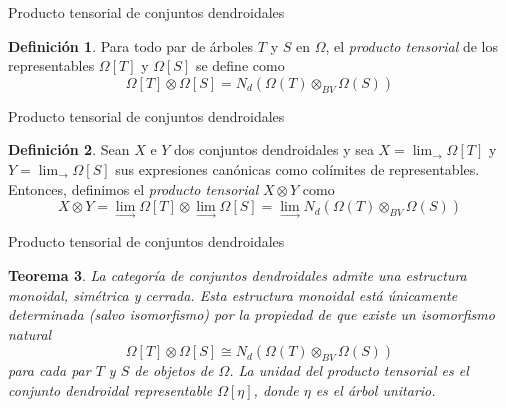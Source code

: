 \documentclass[12pt,aspectratio=169]{beamer}
\numberwithin{equation}{section}
\newtheorem{teo}{Teorema}[section]
\theoremstyle{definition}
\newtheorem{defi}[teo]{Definici\'on}
\begin{document}
{\begin{frame}{Producto tensorial de conjuntos dendroidales}
    \begin{defi}
        Para todo par de \'arboles $T$ y $S$ en $\Omega$, el \emph{producto tensorial} de los representables $\Omega[T]$ y $\Omega[S]$ se define como
        $$
            \Omega[T]\otimes\Omega[S] = N_d(\Omega(T)\otimes_{BV}\Omega(S))
        $$

    \end{defi}
\end{frame}
\begin{frame}{Producto tensorial de conjuntos dendroidales}
    \begin{defi}
        Sean $X$ e $Y$ dos conjuntos dendroidales y sea $X = \lim_{\to}\Omega[T]$ y $Y = \lim_{\to}\Omega[S]$ sus expresiones can\'onicas como col\'imites de representables. Entonces, definimos el \emph{producto tensorial} $X\otimes Y$ como
        $$
            X\otimes Y = \lim_{\to}\Omega[T]\otimes\lim_{\to}\Omega[S] = \lim_{\to} N_d(\Omega(T)\otimes_{BV}\Omega(S))
        $$
    \end{defi}
\end{frame}
\begin{frame}{Producto tensorial de conjuntos dendroidales}
    \begin{teo}
        La categor\'ia de conjuntos dendroidales admite una estructura monoidal, sim\'etrica y cerrada. Esta estructura monoidal est\'a \'unicamente determinada (salvo isomorfismo) por la propiedad de que existe un isomorfismo natural
        $$
            \Omega[T]\otimes\Omega[S] \cong N_d(\Omega(T)\otimes_{BV}\Omega(S))
        $$
        para cada par $T$ y $S$ de objetos de $\Omega$. La unidad del producto tensorial es el conjunto dendroidal representable $\Omega[\eta]$, donde $\eta$ es el \'arbol unitario.
    \end{teo}
\end{frame}

}
\end{document}
